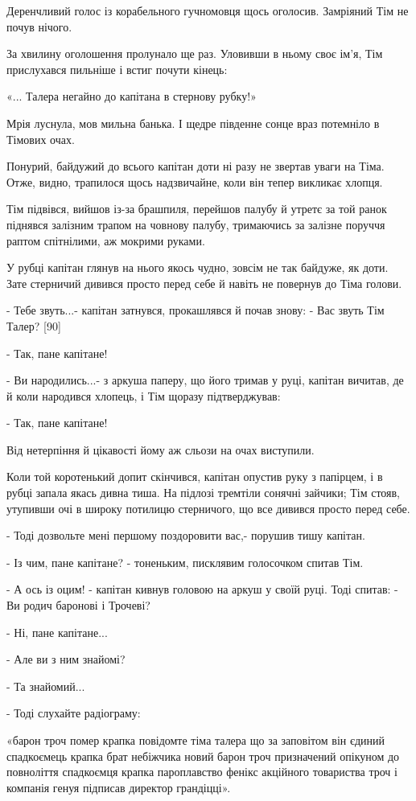 Деренчливий голос із корабельного гучномовця щось оголосив. Замріяний Тім не почув нічого.

За хвилину оголошення пролунало ще раз. Уловивши в ньому своє ім'я, Тім прислухався пильніше і встиг почути кінець:

«... Талера негайно до капітана в стернову рубку!»

Мрія луснула, мов мильна банька. І щедре південне сонце враз потемніло в Тімових очах.

Понурий, байдужий до всього капітан доти ні разу не звертав уваги на Тіма. Отже, видно, трапилося щось надзвичайне, коли він тепер викликає хлопця.

Тім підвівся, вийшов із-за брашпиля, перейшов палубу й утретє за той ранок піднявся залізним трапом на човнову палубу, тримаючись за залізне поруччя раптом спітнілими, аж мокрими руками.

У рубці капітан глянув на нього якось чудно, зовсім не так байдуже, як доти. Зате стерничий дивився просто перед себе й навіть не повернув до Тіма голови.

- Тебе звуть...- капітан затнувся, прокашлявся й почав знову: - Вас звуть Тім Талер? [90]

- Так, пане капітане!

- Ви народились...- з аркуша паперу, що його тримав у руці, капітан вичитав, де й коли народився хлопець, і Тім щоразу підтверджував:

- Так, пане капітане!

Від нетерпіння й цікавості йому аж сльози на очах виступили.

Коли той коротенький допит скінчився, капітан опустив руку з папірцем, і в рубці запала якась дивна тиша. На підлозі тремтіли сонячні зайчики; Тім стояв, утупивши очі в широку потилицю стерничого, що все дивився просто перед себе.

- Тоді дозвольте мені першому поздоровити вас,- порушив тишу капітан.

- Із чим, пане капітане? - тоненьким, писклявим голосочком спитав Тім.

- А ось із оцим! - капітан кивнув головою на аркуш у своїй руці. Тоді спитав: - Ви родич баронові і Трочеві?

- Ні, пане капітане...

- Але ви з ним знайомі?

- Та знайомий...

- Тоді слухайте радіограму:

«барон троч помер крапка повідомте тіма талера що за заповітом він єдиний спадкоємець крапка брат небіжчика новий барон троч призначений опікуном до повноліття спадкоємця крапка пароплавство фенікс акційного товариства троч і компанія генуя підписав директор грандіцці».

